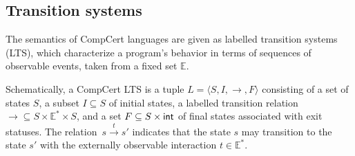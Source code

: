 \documentclass[acmsmall,review,anonymous]{acmart}\settopmatter{printfolios=true,printccs=false,printacmref=false}
\begin{document}
%

\subsection{Transition systems} %

The semantics of CompCert languages are
given as labelled transition systems (LTS),
which characterize a program's behavior in terms of
sequences of observable events,
taken from a fixed set $\mathbb{E}$.

Schematically, a CompCert LTS
is a tuple
$L = \langle S, I, {\rightarrow}, F \rangle$
consisting of
a set of states $S$,
a subset $I \subseteq S$ of initial states,
a labelled transition relation
${\rightarrow} \subseteq S \times \mathbb{E}^* \times S$,
and a set
$F \subseteq S \times  \mathsf{int} $
of final states associated with exit statuses.
The relation~$s \stackrel{t}{\rightarrow} s'$
indicates that the state $s$ may transition to the state $s'$
with the externally observable interaction $t \in \mathbb{E}^*$.
\end{document}
